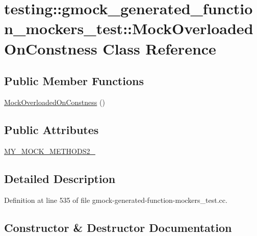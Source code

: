 \hypertarget{classtesting_1_1gmock__generated__function__mockers__test_1_1_mock_overloaded_on_constness}{}\section{testing\+:\+:gmock\+\_\+generated\+\_\+function\+\_\+mockers\+\_\+test\+:\+:Mock\+Overloaded\+On\+Constness Class Reference}
\label{classtesting_1_1gmock__generated__function__mockers__test_1_1_mock_overloaded_on_constness}
\subsection*{Public Member Functions}
\begin{DoxyCompactItemize}
\item 
\hyperlink{classtesting_1_1gmock__generated__function__mockers__test_1_1_mock_overloaded_on_constness_a83e2840ed88fe4a01a878c3bb529d793}{Mock\+Overloaded\+On\+Constness} ()
\end{DoxyCompactItemize}
\subsection*{Public Attributes}
\begin{DoxyCompactItemize}
\item 
\hyperlink{classtesting_1_1gmock__generated__function__mockers__test_1_1_mock_overloaded_on_constness_a3447041442c4ca64d597186e894b307d}{M\+Y\+\_\+\+M\+O\+C\+K\+\_\+\+M\+E\+T\+H\+O\+D\+S2\+\_\+}
\end{DoxyCompactItemize}


\subsection{Detailed Description}


Definition at line 535 of file gmock-\/generated-\/function-\/mockers\+\_\+test.\+cc.



\subsection{Constructor \& Destructor Documentation}
